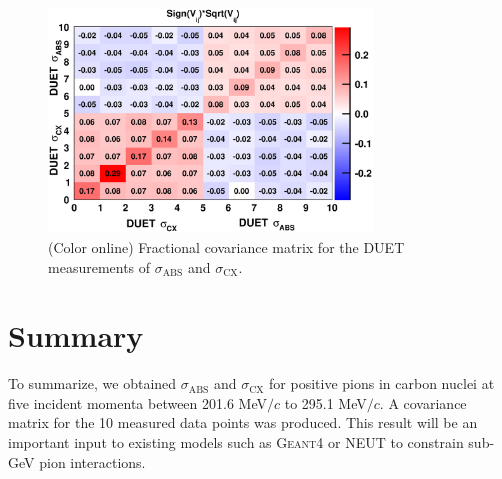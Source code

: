 \begin{figure}[h]
\begin{center}
\includegraphics[width=86mm]{figures/duet_fractional_covariance_forpaper_v2.eps}
\caption{(Color online) Fractional covariance matrix for the DUET measurements of $\sigma_{\mathrm{ABS}}$ and $\sigma_{\mathrm{CX}}$. }
\label{fig:covariance}
\end{center} 
\end{figure}

\section{Summary}
To summarize, we obtained $\sigma_{\mathrm{ABS}}$ and $\sigma_{\mathrm{CX}}$ for positive pions in carbon nuclei at five incident momenta between 201.6 MeV$/c$ to 295.1 MeV$/c$. A covariance matrix for the 10 measured data points was produced. This result will be an important input to existing models such as \textsc{Geant4} or \textsc{NEUT} to constrain sub-GeV pion interactions.
